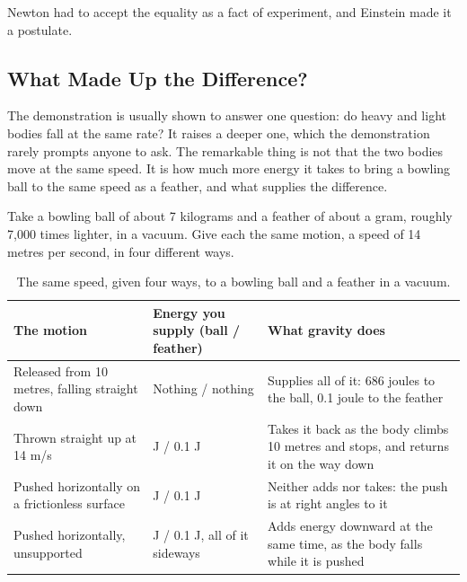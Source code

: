 \documentclass[11pt,a4paper]{article}
\begin{document}
Newton had to accept the equality as a fact of experiment, and Einstein made it a postulate. 

\subsection*{What Made Up the Difference?}

The demonstration is usually shown to answer one question: do heavy and light bodies fall at the same rate? It raises a deeper one, which the demonstration rarely prompts anyone to ask. The remarkable thing is not that the two bodies move at the same speed. It is how much more energy it takes to bring a bowling ball to the same speed as a feather, and what supplies the difference.

Take a bowling ball of about 7 kilograms and a feather of about a gram, roughly 7{,}000 times lighter, in a vacuum. Give each the same motion, a speed of 14 metres per second, in four different ways.

\begin{table}[H]
\centering
\small
\renewcommand{\arraystretch}{1.3}
\begin{tabular}{@{}>{\raggedright\arraybackslash}p{}>{\raggedright\arraybackslash}p{}>{\raggedright\arraybackslash}p{}@{}}
\toprule
\textbf{The motion} & \textbf{Energy you supply (ball / feather)} & \textbf{What gravity does} \\
\midrule
Released from 10 metres, falling straight down & Nothing / nothing & Supplies all of it: 686 joules to the ball, 0.1 joule to the feather \\
Thrown straight up at 14 m/s & 686 J / 0.1 J & Takes it back as the body climbs 10 metres and stops, and returns it on the way down \\
Pushed horizontally on a frictionless surface & 686 J / 0.1 J & Neither adds nor takes: the push is at right angles to it \\
Pushed horizontally, unsupported & 686 J / 0.1 J, all of it sideways & Adds energy downward at the same time, as the body falls while it is pushed \\
\bottomrule
\end{tabular}
\caption{The same speed, given four ways, to a bowling ball and a feather in a vacuum.}
\label{tab:difference}
\end{table}
\end{document}
